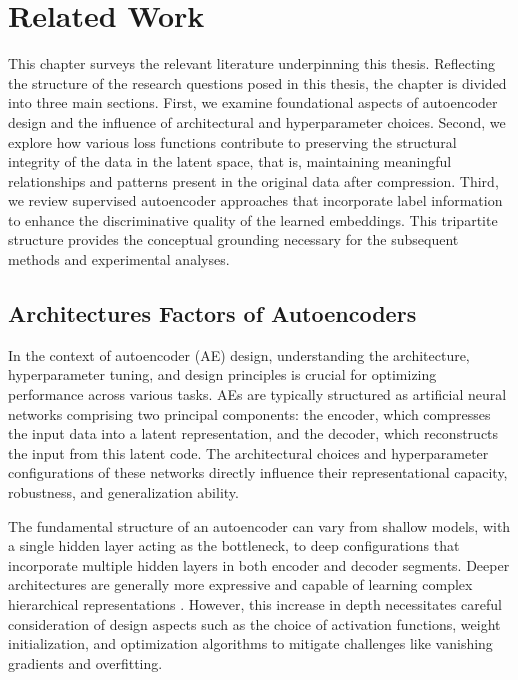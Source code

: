 \chapter{Related Work} \label{ch:related_work}

This chapter surveys the relevant literature underpinning this thesis. Reflecting the structure of the research questions posed in this thesis, the chapter is divided into three main sections. First, we examine foundational aspects of autoencoder design and the influence of architectural and hyperparameter choices. Second, we explore how various loss functions contribute to preserving the structural integrity of the data in the latent space, that is, maintaining meaningful relationships and patterns present in the original data after compression. Third, we review supervised autoencoder approaches that incorporate label information to enhance the discriminative quality of the learned embeddings. This tripartite structure provides the conceptual grounding necessary for the subsequent methods and experimental analyses.

\section{Architectures Factors of Autoencoders}

In the context of autoencoder (AE) design, understanding the architecture, hyperparameter tuning, and design principles is crucial for optimizing performance across various tasks. AEs are typically structured as artificial neural networks comprising two principal components: the encoder, which compresses the input data into a latent representation, and the decoder, which reconstructs the input from this latent code. The architectural choices and hyperparameter configurations of these networks directly influence their representational capacity, robustness, and generalization ability.

The fundamental structure of an autoencoder can vary from shallow models, with a single hidden layer acting as the bottleneck, to deep configurations that incorporate multiple hidden layers in both encoder and decoder segments. Deeper architectures are generally more expressive and capable of learning complex hierarchical representations \cite{Goodfellow16}. However, this increase in depth necessitates careful consideration of design aspects such as the choice of activation functions, weight initialization, and optimization algorithms to mitigate challenges like vanishing gradients and overfitting.


